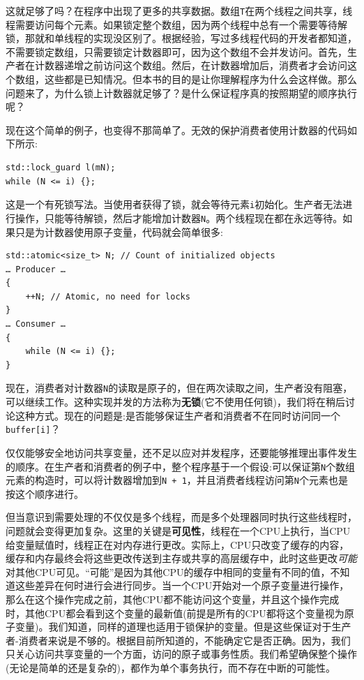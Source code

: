 这就足够了吗？在程序中出现了更多的共享数据。数组\texttt{T}在两个线程之间共享，线程需要访问每个元素。如果锁定整个数组，因为两个线程中总有一个需要等待解锁，那就和单线程的实现没区别了。根据经验，写过多线程代码的开发者都知道，不需要锁定数组，只需要锁定计数器即可，因为这个数组不会并发访问。首先，生产者在计数器递增之前访问这个数组。然后，在计数器增加后，消费者才会访问这个数组，这些都是已知情况。但本书的目的是让你理解程序为什么会这样做。那么问题来了，为什么锁上计数器就足够了？是什么保证程序真的按照期望的顺序执行呢？

现在这个简单的例子，也变得不那简单了。无效的保护消费者使用计数器的代码如下所示:

\begin{lstlisting}[style=styleCXX]
std::lock_guard l(mN);
while (N <= i) {};
\end{lstlisting}

这是一个有死锁写法。当使用者获得了锁，就会等待元素\texttt{i}初始化。生产者无法进行操作，只能等待解锁，然后才能增加计数器\texttt{N}。两个线程现在都在永远等待。如果只是为计数器使用原子变量，代码就会简单很多:

\begin{lstlisting}[style=styleCXX]
std::atomic<size_t> N; // Count of initialized objects
… Producer …
{
	++N; // Atomic, no need for locks
}
… Consumer …
{
	while (N <= i) {};
}
\end{lstlisting}

现在，消费者对计数器\texttt{N}的读取是原子的，但在两次读取之间，生产者没有阻塞，可以继续工作。这种实现并发的方法称为\textbf{无锁}(它不使用任何锁)，我们将在稍后讨论这种方式。现在的问题是:是否能够保证生产者和消费者不在同时访问同一个\texttt{buffer[i]}？


仅仅能够安全地访问共享变量，还不足以应对并发程序，还要能够推理出事件发生的顺序。在生产者和消费者的例子中，整个程序基于一个假设:可以保证第\texttt{N}个数组元素的构造时，可以将计数器增加到\texttt{N + 1}，并且消费者线程访问第\texttt{N}个元素也是按这个顺序进行。

但当意识到需要处理的不仅仅是多个线程，而是多个处理器同时执行这些线程时，问题就会变得更加复杂。这里的关键是\textbf{可见性}，线程在一个CPU上执行，当CPU给变量赋值时，线程正在对内存进行更改。实际上，CPU只改变了缓存的内容，缓存和内存最终会将这些更改传送到主存或共享的高层缓存中，此时这些更改\textit{可能}对其他CPU可见。“可能”是因为其他CPU的缓存中相同的变量有不同的值，不知道这些差异在何时进行会进行同步。当一个CPU开始对一个原子变量进行操作，那么在这个操作完成之前，其他CPU都不能访问这个变量，并且这个操作完成时，其他CPU都会看到这个变量的最新值(前提是所有的CPU都将这个变量视为原子变量)。我们知道，同样的道理也适用于锁保护的变量。但是这些保证对于生产者-消费者来说是不够的。根据目前所知道的，不能确定它是否正确。因为，我们只关心访问共享变量的一个方面，访问的原子或事务性质。我们希望确保整个操作(无论是简单的还是复杂的)，都作为单个事务执行，而不存在中断的可能性。

